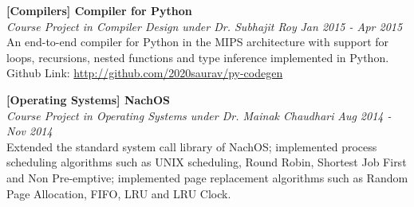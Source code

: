 \documentclass[margin,10pt]{resume}
\begin{document}
\begin{resume}
\begin{list2}
	\vspace{4mm}

\item \textbf{[Compilers] Compiler for Python}\\
	\textsl{Course Project in Compiler Design under Dr. Subhajit Roy} \hfill \emph{Jan 2015 - Apr 2015}\\
	An end-to-end compiler for Python in the MIPS architecture with support for loops, recursions, nested functions and type inference implemented in Python.\\
	 Github Link: \url{http://github.com/2020saurav/py-codegen}

	\vspace{4mm}

\item \textbf{[Operating Systems] NachOS}\\
	\textsl{Course Project in Operating Systems under Dr. Mainak Chaudhari} \hfill \emph{Aug 2014 - Nov 2014}\\
	Extended the standard system call library of NachOS; implemented process scheduling algorithms such as UNIX scheduling, Round Robin, Shortest Job First and Non Pre-emptive; implemented page replacement algorithms such as Random Page Allocation, FIFO, LRU and LRU Clock.

	\vspace{4mm}




\end{list2}
\end{resume}
\end{document}

